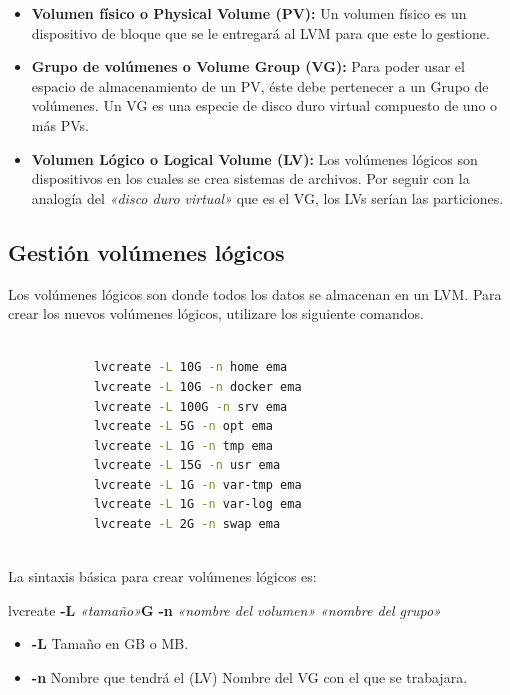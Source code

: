 				\begin{itemize}
					
					\item \textbf{Volumen físico o Physical Volume (PV):} Un volumen físico es un dispositivo de bloque que se le entregará al LVM para que este lo gestione.
					
					\item \textbf{Grupo de volúmenes o Volume Group (VG):} Para poder usar el espacio de almacenamiento de un PV, éste debe pertenecer a un Grupo de volúmenes. Un VG es una especie de disco duro virtual compuesto de uno o más PVs. 
					
					\item \textbf{Volumen Lógico o Logical Volume (LV):} Los volúmenes lógicos son dispositivos en los cuales se crea sistemas de archivos. Por seguir con la analogía del \textit{«disco duro virtual»} que es el VG, los LVs serían las particiones. 
					
				\end{itemize}
			
	
		\subsection{Gestión volúmenes lógicos}
		
			Los volúmenes lógicos son donde todos los datos se almacenan en un LVM. Para crear los nuevos volúmenes lógicos, utilizare los siguiente comandos.

			
			\begin{lstlisting}[language=Bash, caption=Creación de LV]
				
			lvcreate -L 10G -n home ema
			lvcreate -L 10G -n docker ema
			lvcreate -L 100G -n srv ema
			lvcreate -L 5G -n opt ema
			lvcreate -L 1G -n tmp ema
			lvcreate -L 15G -n usr ema
			lvcreate -L 1G -n var-tmp ema
			lvcreate -L 1G -n var-log ema
			lvcreate -L 2G -n swap ema
								
			\end{lstlisting}
		
			La sintaxis básica para crear volúmenes lógicos es:
			
			lvcreate \textbf{-L} \textit{«tamaño»}\textbf{G} \textbf{-n} \textit{«nombre del volumen»} \textit{«nombre del grupo»}
			
			\begin{itemize}
				
				\item \textbf{-L} Tamaño en GB o MB.
				\item \textbf{-n} Nombre que tendrá el (LV) Nombre del VG con el que se trabajara.
			 
			\end{itemize}
			
